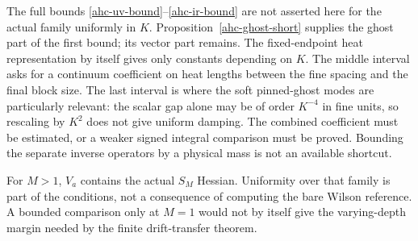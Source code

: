 The full bounds \eqref{ahc-uv-bound}--\eqref{ahc-ir-bound}
are not asserted here for the actual family uniformly in
\(K\). Proposition~\ref{ahc-ghost-short} supplies the
ghost part of the first bound; its vector part remains.
The fixed-endpoint heat representation by itself gives
only constants depending on \(K\). The middle interval asks for a
continuum coefficient on heat lengths between the
fine spacing and the final block size. The last
interval is where the soft pinned-ghost modes are
particularly relevant: the scalar gap alone may be
of order \(K^{-4}\) in fine units, so rescaling by
\(K^2\) does not give uniform damping. The combined
coefficient must be estimated, or a weaker signed
integral comparison must be proved. Bounding the
separate inverse operators by a physical mass is
not an available shortcut.

For \(M>1\), \(V_a\) contains the actual \(S_M\)
Hessian. Uniformity over that family is part of the
conditions, not a consequence of computing the bare
Wilson reference. A bounded comparison only at \(M=1\)
would not by itself give the varying-depth margin
needed by the finite drift-transfer theorem.


